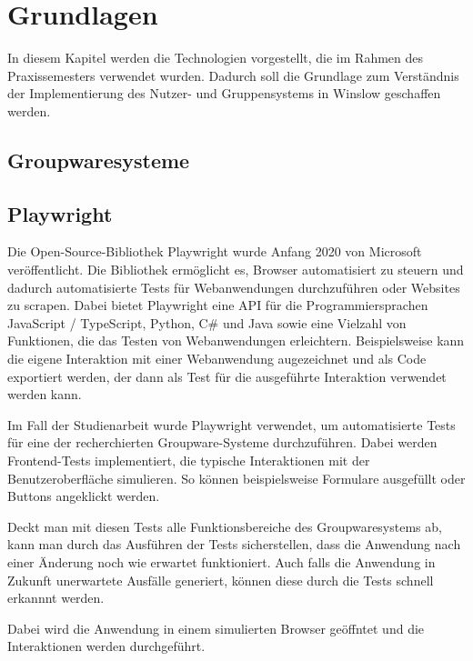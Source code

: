 \chapter{Grundlagen}

In diesem Kapitel werden die Technologien vorgestellt, die im Rahmen des Praxissemesters verwendet wurden.
Dadurch soll die Grundlage zum Verständnis der Implementierung des Nutzer- und Gruppensystems in Winslow geschaffen werden.

\section{Groupwaresysteme}

\section{Playwright}

Die Open-Source-Bibliothek Playwright wurde Anfang 2020 von Microsoft veröffentlicht.
Die Bibliothek ermöglicht es, Browser automatisiert zu steuern und dadurch automatisierte Tests für Webanwendungen durchzuführen oder Websites zu scrapen.
Dabei bietet Playwright eine API für die Programmiersprachen JavaScript / TypeScript, Python, C\# und Java sowie eine Vielzahl von Funktionen, die das Testen von Webanwendungen erleichtern.
Beispielsweise kann die eigene Interaktion mit einer Webanwendung augezeichnet und als Code exportiert werden, der dann als Test für die ausgeführte Interaktion verwendet werden kann.

Im Fall der Studienarbeit wurde Playwright verwendet, um automatisierte Tests für eine der recherchierten Groupware-Systeme durchzuführen.
Dabei werden Frontend-Tests implementiert, die typische Interaktionen mit der Benutzeroberfläche simulieren.
So können beispielsweise Formulare ausgefüllt oder Buttons angeklickt werden.

Deckt man mit diesen Tests alle Funktionsbereiche des Groupwaresystems ab, kann man durch das Ausführen der Tests sicherstellen, dass die Anwendung nach einer Änderung noch wie erwartet funktioniert.
Auch falls die Anwendung in Zukunft unerwartete Ausfälle generiert, können diese durch die Tests schnell erkannnt werden.





Dabei wird die Anwendung in einem simulierten Browser geöffntet und die Interaktionen werden durchgeführt.

\autocite[Quelle:][]{angular}





